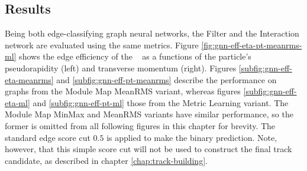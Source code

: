 \subsection{Results}
\label{subsect:ignn-result}


Being both edge-classifying graph neural networks, the Filter and the Interaction network are evaluated using the same metrics. 
Figure \ref{fig:gnn-eff-eta-pt-meanrms-ml} shows the edge efficiency of the \ignn~ as a functions of the particle's pseudorapidity (left) and transverse momentum (right). 
Figures \ref{subfig:gnn-eff-eta-meanrms} and \ref{subfig:gnn-eff-pt-meanrms} describe the performance on graphs from the Module Map MeanRMS variant, whereas figures \ref{subfig:gnn-eff-eta-ml} and \ref{subfig:gnn-eff-pt-ml} those from the Metric Learning variant.
The Module Map MinMax and MeanRMS variants have similar performance, so the former is omitted from all following figures in this chapter for brevity.
The standard edge score cut $0.5$ is applied to make the binary prediction.
Note, however, that this simple score cut will not be used to construct the final track candidate, as described in chapter \ref{chap:track-building}.

